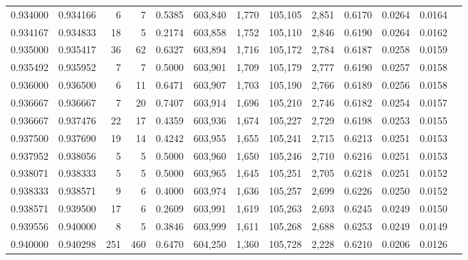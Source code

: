 \begin{tabular}{rrrrrrrrrrrrr}
0.934000 & 0.934166 &     6 &   7 &                                     0.5385 & 603,840 &   1,770 & 105,105 &   2,851 & 0.6170 & 0.0264 & 0.0164 \\
0.934167 & 0.934833 &    18 &   5 &                                     0.2174 & 603,858 &   1,752 & 105,110 &   2,846 & 0.6190 & 0.0264 & 0.0162 \\
0.935000 & 0.935417 &    36 &  62 &                                     0.6327 & 603,894 &   1,716 & 105,172 &   2,784 & 0.6187 & 0.0258 & 0.0159 \\
0.935492 & 0.935952 &     7 &   7 &                                     0.5000 & 603,901 &   1,709 & 105,179 &   2,777 & 0.6190 & 0.0257 & 0.0158 \\
0.936000 & 0.936500 &     6 &  11 &                                     0.6471 & 603,907 &   1,703 & 105,190 &   2,766 & 0.6189 & 0.0256 & 0.0158 \\
0.936667 & 0.936667 &     7 &  20 &                                     0.7407 & 603,914 &   1,696 & 105,210 &   2,746 & 0.6182 & 0.0254 & 0.0157 \\
0.936667 & 0.937476 &    22 &  17 &                                     0.4359 & 603,936 &   1,674 & 105,227 &   2,729 & 0.6198 & 0.0253 & 0.0155 \\
0.937500 & 0.937690 &    19 &  14 &                                     0.4242 & 603,955 &   1,655 & 105,241 &   2,715 & 0.6213 & 0.0251 & 0.0153 \\
0.937952 & 0.938056 &     5 &   5 &                                     0.5000 & 603,960 &   1,650 & 105,246 &   2,710 & 0.6216 & 0.0251 & 0.0153 \\
0.938071 & 0.938333 &     5 &   5 &                                     0.5000 & 603,965 &   1,645 & 105,251 &   2,705 & 0.6218 & 0.0251 & 0.0152 \\
0.938333 & 0.938571 &     9 &   6 &                                     0.4000 & 603,974 &   1,636 & 105,257 &   2,699 & 0.6226 & 0.0250 & 0.0152 \\
0.938571 & 0.939500 &    17 &   6 &                                     0.2609 & 603,991 &   1,619 & 105,263 &   2,693 & 0.6245 & 0.0249 & 0.0150 \\
0.939556 & 0.940000 &     8 &   5 &                                     0.3846 & 603,999 &   1,611 & 105,268 &   2,688 & 0.6253 & 0.0249 & 0.0149 \\
0.940000 & 0.940298 &   251 & 460 &                                     0.6470 & 604,250 &   1,360 & 105,728 &   2,228 & 0.6210 & 0.0206 & 0.0126 \\

\end{tabular}
